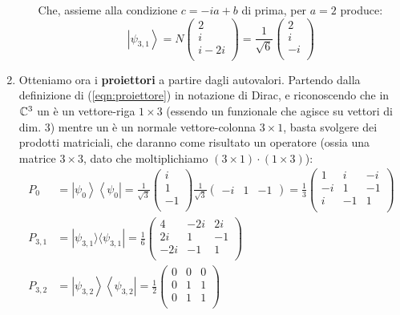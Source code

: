 \documentclass[../../FisicaTeorica.tex]{subfiles}
\begin{document}
\begin{enumerate}
\begin{itemize}
\[	\]
	Che, assieme alla condizione $c=-ia+b$ di prima, per $a=2$ produce:
	\[
	\left|\psi_{3,1}\right\rangle=N\left(\begin{matrix}2\\i\\i-2i\\\end{matrix}\right)=\frac{1}{\sqrt6}\left(\begin{matrix}2\\i\\-i\\\end{matrix}\right)
	\]
\end{itemize}
\item Otteniamo ora i \textbf{proiettori} a partire dagli autovalori. Partendo dalla definizione di (\ref{eqn:proiettore}) in notazione di Dirac, e riconoscendo che in $\mathbb{C}^3$ un  è un vettore-riga $1\times 3$ (essendo un funzionale che agisce su vettori di dim. 3) mentre un  è un normale vettore-colonna $3\times 1$, basta svolgere dei prodotti matriciali, che daranno come risultato un operatore (ossia una matrice $3\times 3$, dato che moltiplichiamo $(3\times 1) \cdot (1\times 3)$):
\begin{align*}
	P_0&=\left|\psi_0\right\rangle\left\langle\psi_0\right|=\frac{1}{\sqrt3}\left(\begin{matrix}i\\1\\-1\\\end{matrix}\right)\frac{1}{\sqrt3}\left(\begin{matrix}-i & 1 & -1\end{matrix}\right)=\frac{1}{3}\left(\begin{matrix}1&i&-i\\-i&1&-1\\i&-1&1\\\end{matrix}\right)\\
	P_{3,1}&=|\psi_{3,1}\rangle \langle \psi_{3,1}|=\frac{1}{6}\left(\begin{matrix}4&-2i&2i\\2i&1&-1\\-2i&-1&1\\\end{matrix}\right)\\
	P_{3,2}&=\left|\psi_{3,2}\right\rangle\left\langle\psi_{3,2}\right|=\frac{1}{2}\left(\begin{matrix}0&0&0\\0&1&1\\0&1&1\\\end{matrix}\right)

\end{align*}
\end{enumerate}
\end{document}
